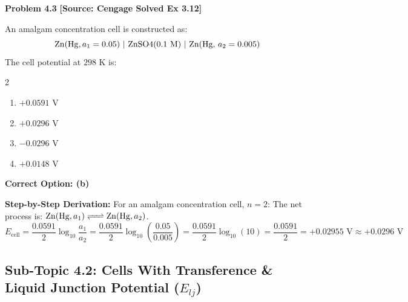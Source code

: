 \begin{problembox}
\textbf{Problem 4.3} \hfill \textbf{[Source: Cengage Solved Ex 3.12]}

An amalgam concentration cell is constructed as:
\begin{equation*}
    \ce{Zn(Hg, } a_1 = 0.05\text{) | ZnSO4(0.1 M) | Zn(Hg, } a_2 = 0.005\text{)}
\end{equation*}
The cell potential at $298\text{ K}$ is:
\begin{multicols}{2}
\begin{enumerate}[label=(\alph*)]
    \item $+0.0591\text{ V}$
    \item $+0.0296\text{ V}$
    \item $-0.0296\text{ V}$
    \item $+0.0148\text{ V}$
\end{enumerate}
\end{multicols}
\end{problembox}
\begin{solution}
\textbf{Correct Option: (b)}

\textbf{Step-by-Step Derivation:}
For an amalgam concentration cell, $n = 2$:
The net process is: $\ce{Zn(Hg, } a_1\ce{) <=> Zn(Hg, } a_2\ce{)}$.
\begin{equation*}
    E_{\text{cell}} = \frac{0.0591}{2} \log_{10} \frac{a_1}{a_2} = \frac{0.0591}{2} \log_{10}\left(\frac{0.05}{0.005}\right) = \frac{0.0591}{2} \log_{10}(10) = \frac{0.0591}{2} = +0.02955\text{ V} \approx +0.0296\text{ V}
\end{equation*}
\end{solution}

\subsection{Sub-Topic 4.2: Cells With Transference \& Liquid Junction Potential ($E_{lj}$)}

